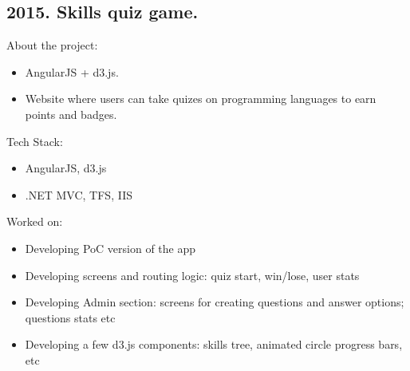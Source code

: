 \documentclass[a4paper, 14pt]{article}
\begin{document}
  \subsection{2015. Skills quiz game.}
    About the project:
    \begin{itemize}
      \item AngularJS + d3.js. \\
      \item Website where users can take quizes on programming languages to earn points and badges. \\
    \end{itemize}
    Tech Stack:
    \begin{itemize}
      \item AngularJS, d3.js \\
      \item .NET MVC, TFS, IIS \\
    \end{itemize}
    Worked on: 
    \begin{itemize}
      \item Developing PoC version of the app \\
      \item Developing screens and routing logic: quiz start, win/lose, user stats \\
      \item Developing Admin section: screens for creating questions and answer options; questions stats etc \\
      \item Developing a few d3.js components: skills tree, animated circle progress bars, etc \\
    \end{itemize}
\end{document}
